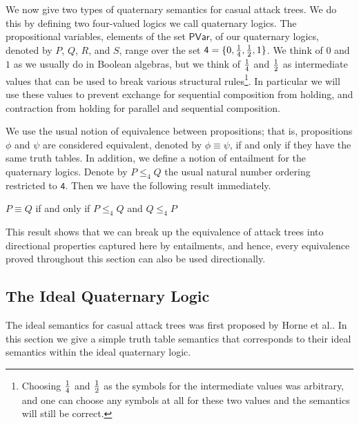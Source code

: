 \documentclass{llncs}
\begin{document}
 We now give two types of quaternary semantics for casual attack
 trees.  We do this by defining two four-valued logics we call
 quaternary logics.  The propositional variables, elements of the set
 $\mathsf{PVar}$, of our quaternary logics, denoted by $P$, $Q$, $R$,
 and $S$, range over the set $\mathsf{4} = \{0, \frac{1}{4}, \frac{1}{2}, 1\}$.
 We think of $0$ and $1$ as we usually do in Boolean algebras, but we
 think of $\frac{1}{4}$ and $\frac{1}{2}$ as intermediate values that can be used
 to break various structural rules\footnote{Choosing $\frac{1}{4}$ and
   $\frac{1}{2}$ as the symbols for the intermediate values was arbitrary,
   and one can choose any symbols at all for these two values and the
   semantics will still be correct.}.  In particular we will use these
 values to prevent exchange for sequential composition from holding,
 and contraction from holding for parallel and sequential composition.

We use the usual notion of equivalence between propositions; that is,
propositions $\phi$ and $\psi$ are considered equivalent, denoted by
$\phi \equiv \psi$, if and only if they have the same truth tables.
In addition, we define a notion of entailment for the quaternary
logics.  Denote by $P \leq_4 Q$ the usual natural number ordering
restricted to $\mathsf{4}$.  Then we have the following result
immediately.
\begin{lemma}
  \label{lemma:entailment_in_the_quaternary_semantics}
  $P \equiv Q$ if and only if $P \leq_4 Q$ and $Q \leq_4 P$
\end{lemma}
This result shows that we can break up the equivalence of attack trees
into directional properties captured here by entailments, and hence,
every equivalence proved throughout this section can also be used
directionally.

\subsection{The Ideal Quaternary Logic}
\label{subsec:the_ideal_quaternary_semantics}
The ideal semantics for casual attack trees was first proposed by
Horne et al.\cite{horne2017semantics}.  In this section we give a
simple truth table semantics that corresponds to their ideal semantics
within the ideal quaternary logic.
\end{document}
